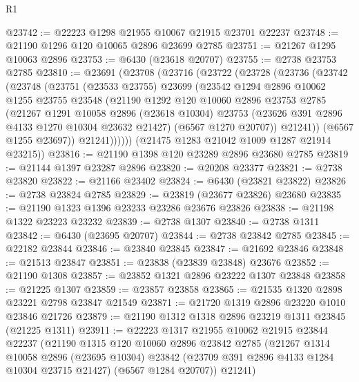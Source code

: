 \begin{lexlean}{R1}
\begin{coremodule}
@23742 := @22223 @1298 @21955 @10067 @21915 @23701 @22237
@23748 := @21190 @1296 @120 @10065 @2896 @23699 @2785
@23751 := @21267 @1295 @10063 @2896
@23753 := @6430 (@23618 @20707)
@23755 := @2738 @23753 @2785
@23810 := @23691
    (@23708
      (@23716
        (@23722
          (@23728
            (@23736
              (@23742
                (@23748
                  (@23751
                    (@23533 @23755)
                    @23699
                    (@23542
                      @1294
                      @2896
                      @10062
                      @1255
                      @23755
                      @23548
                      (@21190
                        @1292
                        @120
                        @10060
                        @2896
                        @23753
                        @2785
                        (@21267
                          @1291
                          @10058
                          @2896
                          (@23618 @10304)
                          @23753
                          (@23626 @391 @2896 @4133 @1270 @10304 @23632 @21427)
                          (@6567 @1270 @20707))
                        @21241))
                    (@6567 @1255 @23697))
                  @21241))))))
      (@21475 @1283 @21042 @1009 @1287 @21914 @23215))
@23816 := @21190 @1398 @120 @23289 @2896 @23680 @2785
@23819 := @21144 @1397 @23287 @2896
@23820 := @20208 @23377
@23821 := @2738 @23820
@23822 := @21166 @23402
@23824 := @6430 (@23821 @23822)
@23826 := @2738 @23824 @2785
@23829 := @23819 (@23677 @23826) @23680
@23835 := @21190 @1323 @1396 @23233 @23286 @23676 @23826
@23838 := @21198 @1322 @23223 @23232
@23839 := @2738 @1307
@23840 := @2738 @1311
@23842 := @6430 (@23695 @20707)
@23844 := @2738 @23842 @2785
@23845 := @22182 @23844
@23846 := @23840 @23845
@23847 := @21692 @23846
@23848 := @21513 @23847
@23851 := @23838 (@23839 @23848) @23676
@23852 := @21190 @1308
@23857 := @23852 @1321 @2896 @23222 @1307 @23848
@23858 := @21225 @1307
@23859 := @23857 @23858
@23865 := @21535 @1320 @2898 @23221 @2798 @23847 @21549
@23871 := @21720 @1319 @2896 @23220 @1010 @23846 @21726
@23879 := @21190 @1312 @1318 @2896 @23219 @1311 @23845 (@21225 @1311)
@23911 := @22223
    @1317
    @21955
    @10062
    @21915
    @23844
    @22237
    (@21190
      @1315
      @120
      @10060
      @2896
      @23842
      @2785
      (@21267
        @1314
        @10058
        @2896
        (@23695 @10304)
        @23842
        (@23709 @391 @2896 @4133 @1284 @10304 @23715 @21427)
        (@6567 @1284 @20707))
      @21241)

\end{coremodule}
\end{lexlean}
